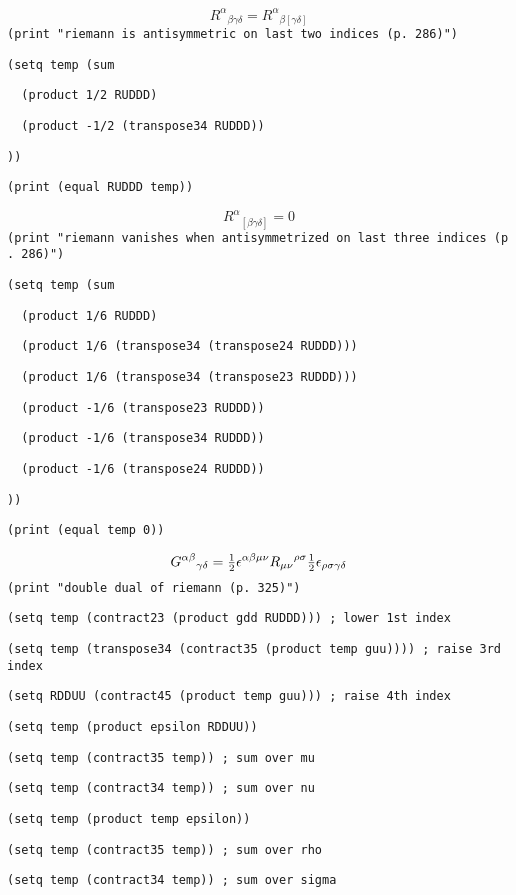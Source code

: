 $${R^\alpha}_{\beta\gamma\delta}={R^\alpha}_{\beta[\gamma\delta]}$$
{\tt (print\ "riemann\ is\ antisymmetric\ on\ last\ two\ indices\ (p.\ 286)")}

{\tt (setq\ temp\ (sum}

{\tt \ \ (product\ 1/2\ RUDDD)}

{\tt \ \ (product\ -1/2\ (transpose34\ RUDDD))}

{\tt ))}

{\tt (print\ (equal\ RUDDD\ temp))}

$${R^\alpha}_{[\beta\gamma\delta]}=0$$
{\tt (print\ "riemann\ vanishes\ when\ antisymmetrized\ on\ last\ three\ indices\ (p.\ 286)")}

{\tt (setq\ temp\ (sum}

{\tt \ \ (product\ 1/6\ RUDDD)}

{\tt \ \ (product\ 1/6\ (transpose34\ (transpose24\ RUDDD)))}

{\tt \ \ (product\ 1/6\ (transpose34\ (transpose23\ RUDDD)))}

{\tt \ \ (product\ -1/6\ (transpose23\ RUDDD))}

{\tt \ \ (product\ -1/6\ (transpose34\ RUDDD))}

{\tt \ \ (product\ -1/6\ (transpose24\ RUDDD))}

{\tt ))}

{\tt (print\ (equal\ temp\ 0))}

$${G^{\alpha\beta}}_{\gamma\delta}=
\hbox{$1\over2$}\epsilon^{\alpha\beta\mu\nu}
{R_{\mu\nu}}^{\rho\sigma}
\hbox{$1\over2$}\epsilon_{\rho\sigma\gamma\delta}$$
{\tt (print\ "double\ dual\ of\ riemann\ (p.\ 325)")}

{\tt (setq\ temp\ (contract23\ (product\ gdd\ RUDDD)))\ ;\ lower\ 1st\ index}

{\tt (setq\ temp\ (transpose34\ (contract35\ (product\ temp\ guu))))\ ;\ raise\ 3rd\ index}

{\tt (setq\ RDDUU\ (contract45\ (product\ temp\ guu)))\ ;\ raise\ 4th\ index}

{\tt (setq\ temp\ (product\ epsilon\ RDDUU))}

{\tt (setq\ temp\ (contract35\ temp))\ ;\ sum\ over\ mu}

{\tt (setq\ temp\ (contract34\ temp))\ ;\ sum\ over\ nu}

{\tt (setq\ temp\ (product\ temp\ epsilon))}

{\tt (setq\ temp\ (contract35\ temp))\ ;\ sum\ over\ rho}

{\tt (setq\ temp\ (contract34\ temp))\ ;\ sum\ over\ sigma}

